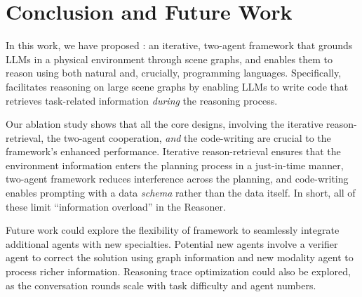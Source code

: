 \section{Conclusion and Future Work}
In this work, we have proposed \RwR: an iterative, two-agent framework that grounds LLMs in a physical environment through scene graphs, and enables them to reason using both natural and, crucially, programming languages. Specifically, \RwR facilitates reasoning on large scene graphs by enabling LLMs to write code that retrieves task-related information \emph{during} the reasoning process.

Our ablation study shows that all the core designs, involving the iterative reason-retrieval, the two-agent cooperation, \emph{and} the code-writing are crucial to the framework's enhanced performance. Iterative reason-retrieval ensures that the environment information enters the planning process in a just-in-time manner, two-agent framework reduces interference across the planning, and code-writing enables prompting with a data \emph{schema} rather than the data itself. In short, all of these limit ``information overload'' in the Reasoner.

Future work could explore the flexibility of \RwR framework to seamlessly integrate  additional agents with new specialties. Potential new agents involve a verifier agent to correct the solution using graph information and new modality agent to process richer information. Reasoning trace optimization could also be explored, as the conversation rounds scale with task difficulty and agent numbers.






